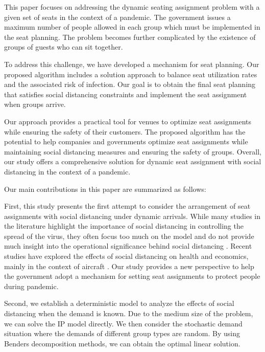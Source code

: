 This paper focuses on addressing the dynamic seating assignment problem with a given set of seats in the context of a pandemic. The government issues a maximum number of people allowed in each group which must be implemented in the seat planning. The problem becomes further complicated by the existence of groups of guests who can sit together.


To address this challenge, we have developed a mechanism for seat planning. Our proposed algorithm includes a solution approach to balance seat utilization rates and the associated risk of infection. Our goal is to obtain the final seat planning that satisfies social distancing constraints and implement the seat assignment when groups arrive.

Our approach provides a practical tool for venues to optimize seat assignments while ensuring the safety of their customers. The proposed algorithm has the potential to help companies and governments optimize seat assignments while maintaining social distancing measures and ensuring the safety of groups. Overall, our study offers a comprehensive solution for dynamic seat assignment with social distancing in the context of a pandemic.


Our main contributions in this paper are summarized as follows:

First, this study presents the first attempt to consider the arrangement of seat assignments with social distancing under dynamic arrivals. While many studies in the literature highlight the importance of social distancing in controlling the spread of the virus, they often focus too much on the model and do not provide much insight into the operational significance behind social distancing \cite{barry2021optimal, fischetti2021safe}. Recent studies have explored the effects of social distancing on health and economics, mainly in the context of aircraft \cite{salari2020social, ghorbani2020model, salari2022social}. Our study provides a new perspective to help the government adopt a mechanism for setting seat assignments to protect people during pandemic.

Second, we establish a deterministic model to analyze the effects of social distancing when the demand is known. Due to the medium size of the problem, we can solve the IP model directly. We then consider the stochastic demand situation where the demands of different group types are random. By using Benders decomposition methods, we can obtain the optimal linear solution.

